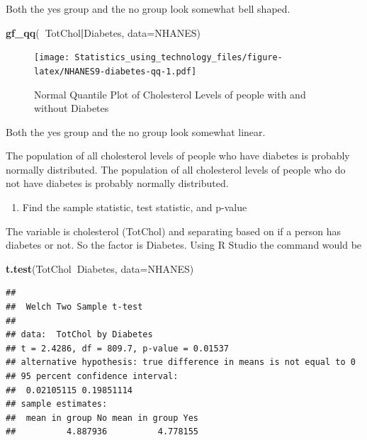 \documentclass[
]{book}
\newenvironment{Shaded}{\begin{snugshade}}{\end{snugshade}}
\newcommand{\DataTypeTok}[1]{\textcolor[rgb]{0.13,0.29,0.53}{#1}}
\newcommand{\KeywordTok}[1]{\textcolor[rgb]{0.13,0.29,0.53}{\textbf{#1}}}
\newcommand{\NormalTok}[1]{#1}
\newcommand{\OperatorTok}[1]{\textcolor[rgb]{0.81,0.36,0.00}{\textbf{#1}}}
\providecommand{\tightlist}{%
  \setlength{\itemsep}{0pt}\setlength{\parskip}{0pt}}
\begin{document}
Both the yes group and the no group look somewhat bell shaped.



\begin{Shaded}
\begin{Highlighting}[]
\KeywordTok{gf_qq}\NormalTok{(}\OperatorTok{~}\NormalTok{TotChol}\OperatorTok{|}\NormalTok{Diabetes, }\DataTypeTok{data=}\NormalTok{NHANES)}
\end{Highlighting}
\end{Shaded}

\begin{figure}
\centering
\texttt{[image: Statistics\_using\_technology\_files/figure-latex/NHANES9-diabetes-qq-1.pdf]}
\caption{\label{fig:NHANES9-diabetes-qq}Normal Quantile Plot of Cholesterol Levels of people with and without Diabetes}
\end{figure}

Both the yes group and the no group look somewhat linear.

The population of all cholesterol levels of people who have diabetes is probably normally distributed. The population of all cholesterol levels of people who do not have diabetes is probably normally distributed.

\begin{enumerate}
\def\labelenumi{\arabic{enumi}.}
\setcounter{enumi}{3}
\tightlist
\item
  Find the sample statistic, test statistic, and p-value
\end{enumerate}

The variable is cholesterol (TotChol) and separating based on if a person has diabetes or not. So the factor is Diabetes. Using R Studio the command would be

\begin{Shaded}
\begin{Highlighting}[]
\KeywordTok{t.test}\NormalTok{(TotChol}\OperatorTok{~}\NormalTok{Diabetes, }\DataTypeTok{data=}\NormalTok{NHANES)}
\end{Highlighting}
\end{Shaded}

\begin{verbatim}
## 
## 	Welch Two Sample t-test
## 
## data:  TotChol by Diabetes
## t = 2.4286, df = 809.7, p-value = 0.01537
## alternative hypothesis: true difference in means is not equal to 0
## 95 percent confidence interval:
##  0.02105115 0.19851114
## sample estimates:
##  mean in group No mean in group Yes 
##          4.887936          4.778155
\end{verbatim}
\end{document}

